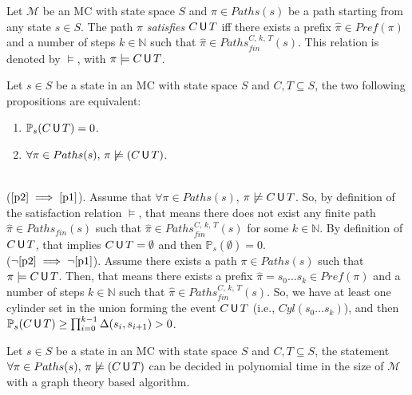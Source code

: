 \begin{definition}
Let $\mathcal{M}$ be an MC with state space $S$ and $\pi \in Paths(s)$ be a path starting from any state $s \in S$. The path $\pi$ \textit{satisfies} $C \,\text{\sffamily U}\, T$ iff there exists a prefix $\hat{\pi}\in Pref(\pi)$ and a number of steps $k \in \mathbb{N}$ such that $\hat{\pi} \in Paths_{fin}^{C,\, k,\, T}(s)$. This relation is denoted by $\models$, with $\pi \models C \,\text{\sffamily U}\, T$.
\end{definition}
\begin{lemma} Let $s \in S$ be a state in an MC with state space $S$ and $C, T \subseteq S$, the two following propositions are equivalent:
  \begin{enumerate}[(a.)]
    \item $\mathbb{P}_s(C \,\text{\sffamily U}\, T) = 0$. \label{p1}
    \item $\forall \pi \in Paths(s), \, \pi \not \models (C \,\text{\sffamily U}\, T)$. \label{p2}
  \end{enumerate}
\end{lemma}

 \begin{proof2}$ $\\
    ($\ref{p2}\implies\ref{p1}$). Assume that $\forall \pi \in
    Paths(s)$, $\pi \centernot\models C \U T$. So, by definition of the satisfaction relation $\models$, that
    means there does not exist any finite path $\hat{\pi} \in
    Paths_{fin}(s)$ such that
    $\hat{\pi} \in Paths_{fin}^{C, \, k,\, T}(s)$ for some $k \in \mathbb{N}$. By definition
    of $C \,\text{\sffamily U}\, T$, that implies $C \,\text{\sffamily U}\, T = \emptyset$ and then
    $\mathbb{P}_s(\emptyset) = 0$.\\
    ($\neg\ref{p2}\implies\neg\ref{p1}$). Assume there exists a path $\pi \in Paths(s)$ such that $\pi \models C \,\text{\sffamily U}\, T$.
    Then, that means there exists a prefix $\hat{\pi} = s_0 \dots s_k \in Pref(\pi)$ and a number of steps $k \in \mathbb{N}$ such that
    $\hat{\pi} \in Paths_{fin}^{C, \, k, \, T}(s)$. So, we have at least one cylinder set in the union forming the event $C \,\text{\sffamily U}\, T$ (i.e., $Cyl(s_0\dots s_k)$), and then $\mathbb{P}_s(C \,\text{\sffamily U}\, T) \geq \prod_{i = 0}^{k-1} \Delta(s_i , s_{i+1}) > 0$.
 \end{proof2}

\begin{lemma}[Computing $S_{=0}$ with graph theory]\label{S0graph}
Let $s \in S$ be a state in an MC with state space $S$ and $C, T \subseteq S$,
  the statement $\forall \pi \in Paths(s), \, \pi \centernot \models (C \U T)$ can be decided in polynomial time in the size of $\mathcal{M}$ with a graph theory based algorithm.
\end{lemma}

